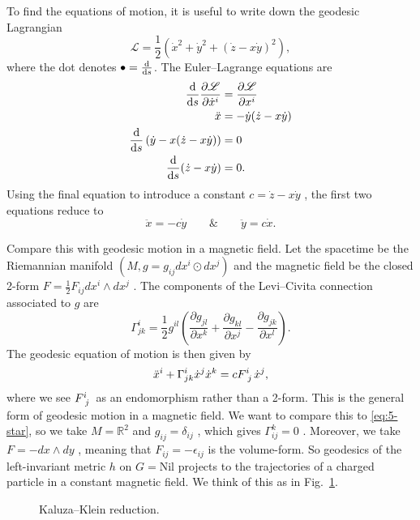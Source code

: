 To find the equations of motion, it is useful to write down the geodesic Lagrangian 
\begin{equation}
  \mathscr{L} = \frac{1}{2}( \dot{x}^2 + \dot{y}^2 + (\dot{z} - x \dot{y})^2),
\end{equation}
where the dot denotes $\bullet = \dv{s}$.
The Euler--Lagrange equations are
\begin{align}
  \dv{s} \frac{\partial \mathscr{L}}{\partial \dot{x}^{i}} &= \frac{\partial \mathscr{L}}{\partial x^{i}} \\
  \ddot x &= - \dot{y} (\dot{z} - x \dot{y}) \\
  \dv{s} \left( \dot{y} - x (\dot{z} - x \dot{y}) \right) &= 0 \\
  \dv{s}(\dot{z} - x \dot{y}) &= 0.
\end{align}
Using the final equation to introduce a constant $c = \dot{z} - x \dot{y}$ , the first two equations reduce to
\begin{equation}
  \label{eq:5-star}
  \ddot x =  - c \dot y \qquad \& \qquad
  \ddot y = c \dot x.
\end{equation}

Compare this with geodesic motion in a magnetic field.
Let the spacetime be the Riemannian manifold $(M, g = g_{ij} dx^{i} \odot dx^{j})$  and the magnetic field be the closed 2-form $F = \frac{1}{2} F_{ij} dx^{i} \wedge dx^{j}$ .
The components of the Levi--Civita connection associated to $g$ are
\begin{equation}
  \Gamma^{i}_{jk} = \frac{1}{2} g^{il} \left( \frac{\partial g_{jl}}{\partial x^{k}} + \frac{\partial g_{kl}}{\partial x^{j}} - \frac{\partial g_{jk}}{\partial x^{l}} \right).
\end{equation}
The geodesic equation of motion is then given by
\begin{equation}
  \ddot x^{i} + \Gamma^{i}_{jk} \dot{x}^{j} \dot{x}^{k} = c F\indices{^{i}_{j}} \dot{x}^{j},
\end{equation}
where we see $F\indices{^{i}_{j}}$  as an endomorphism rather than a 2-form.
This is the general form of geodesic motion in a magnetic field.
We want to compare this to \eqref{eq:5-star}, so we take $M = \mathbb{R}^2$ and $g_{ij} = \delta_{ij}$ , which gives $\Gamma_{ij}^{k} = 0$ .
Moreover, we take $F = -dx \wedge dy$ , meaning that $F_{ij} = - \epsilon_{ij}$  is the volume-form.
So geodesics of the left-invariant metric $h$ on $G = \text{Nil}$  projects to the trajectories of a charged particle in a constant magnetic field.
We think of this as in Fig.~\ref{fig:l5f1}.
\begin{figure}[tbhp]
  \centering
  \def\svgwidth{0.4\columnwidth}
  
  \caption{Kaluza--Klein reduction.}
  \label{fig:l5f1}
\end{figure}

